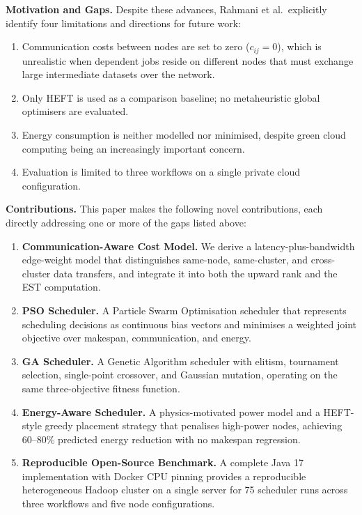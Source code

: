 \documentclass[10pt,twocolumn]{article}
\begin{document}
\noindent\textbf{Motivation and Gaps.}
Despite these advances, Rahmani et al.\ explicitly identify four limitations and
directions for future work:
\begin{enumerate}[leftmargin=1.3cm,label=\arabic*.,topsep=2pt,itemsep=1pt]
  \item Communication costs between nodes are set to zero ($c_{ij}=0$), which is
        unrealistic when dependent jobs reside on different nodes that must exchange
        large intermediate datasets over the network.
  \item Only HEFT is used as a comparison baseline; no metaheuristic global
        optimisers are evaluated.
  \item Energy consumption is neither modelled nor minimised, despite green cloud
        computing being an increasingly important concern.
  \item Evaluation is limited to three workflows on a single private cloud
        configuration.
\end{enumerate}

\noindent\textbf{Contributions.}
This paper makes the following novel contributions, each directly addressing one or
more of the gaps listed above:
\begin{enumerate}[leftmargin=1.3cm,label=\arabic*.,topsep=2pt,itemsep=1pt]
  \item \textbf{Communication-Aware Cost Model.} We derive a latency-plus-bandwidth
        edge-weight model that distinguishes same-node, same-cluster, and
        cross-cluster data transfers, and integrate it into both the upward rank and
        the EST computation.
  \item \textbf{PSO Scheduler.} A Particle Swarm Optimisation scheduler that
        represents scheduling decisions as continuous bias vectors and minimises a
        weighted joint objective over makespan, communication, and energy.
  \item \textbf{GA Scheduler.} A Genetic Algorithm scheduler with elitism,
        tournament selection, single-point crossover, and Gaussian mutation,
        operating on the same three-objective fitness function.
  \item \textbf{Energy-Aware Scheduler.} A physics-motivated power model and a
        HEFT-style greedy placement strategy that penalises high-power nodes,
        achieving 60--80\% predicted energy reduction with no makespan regression.
  \item \textbf{Reproducible Open-Source Benchmark.} A complete Java 17
        implementation with Docker CPU pinning provides a reproducible heterogeneous
        Hadoop cluster on a single server for 75 scheduler runs across three
        workflows and five node configurations.
\end{enumerate}
\end{document}
